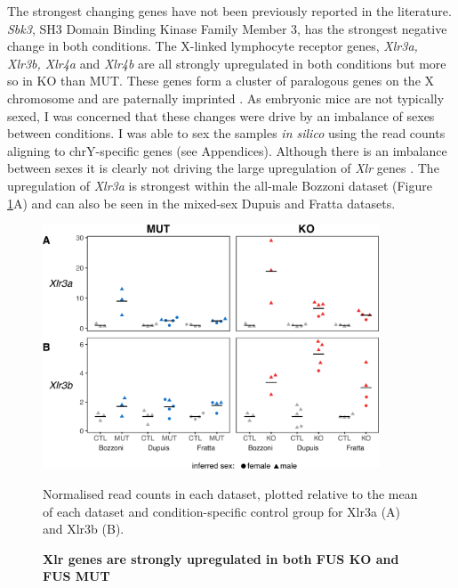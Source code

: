 The strongest changing genes have not been previously reported in the literature.
\textit{Sbk3}, SH3 Domain Binding Kinase Family Member 3, has the strongest negative change in both conditions. 
The X-linked lymphocyte receptor genes, \textit{Xlr3a, Xlr3b, Xlr4a} and \textit{Xlr4b} are all strongly upregulated in both conditions but more so in KO than MUT.
These genes form a cluster of paralogous genes on the X chromosome and are paternally imprinted \cite{Raefski2005}. 
As embryonic mice are not typically sexed, I was concerned that these changes were drive by an imbalance of sexes between conditions.
I was able to sex the samples \textit{in silico} using the read counts aligning to chrY-specific genes (see Appendices). 
Although there is an imbalance between sexes it is clearly not driving the large upregulation of \textit{Xlr} genes . 
The upregulation of \textit{Xlr3a} is strongest within the all-male Bozzoni dataset (Figure \ref{fig:fus_xlr_expression}A) and can also be seen in the mixed-sex Dupuis and Fratta datasets. 

\begin{figure}[h!]
	\centering
	\includegraphics[width=10cm]{Figures/06_fus_meta/xlr_sex_expression.png}
	\caption{\textbf{Xlr genes are strongly upregulated in both FUS KO and FUS MUT} }	
    Normalised read counts in each dataset, plotted relative to the mean of each dataset and condition-specific control group for Xlr3a (A) and Xlr3b (B). 
	\label{fig:fus_xlr_expression}
\end{figure}





